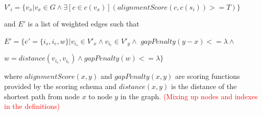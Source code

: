 \documentclass{article}
\begin{document}
\par
$V'_i=\{v_x|v_x \in G \land \exists [c \in c(v_x)](alignmentScore(c, c(s_i)) >= T)\}$\\
\par\noindent
and $E'$ is a list of weighted edges such that\\
\par
$E'=\{e'=\{i_s, i_e, w\}|v_{i_s} \in V'_x \wedge v_{i_e} \in V'_y \wedge$ $gapPenalty(y - x) <= \lambda \wedge $\par$w=distance(v_{i_s}, v_{i_e}) \wedge gapPenalty(w) <= \lambda\}$\\
\par\noindent
where $alignmentScore(x, y)$ and $gapPenalty(x, y)$ are scoring functions provided by the scoring schema and $distance(x, y)$ is the distance of the shortest path from node $x$ to node $y$ in the graph. \textcolor{red}{(Mixing up nodes and indexes in the definitions)}\\
\par\noindent
\end{document}
